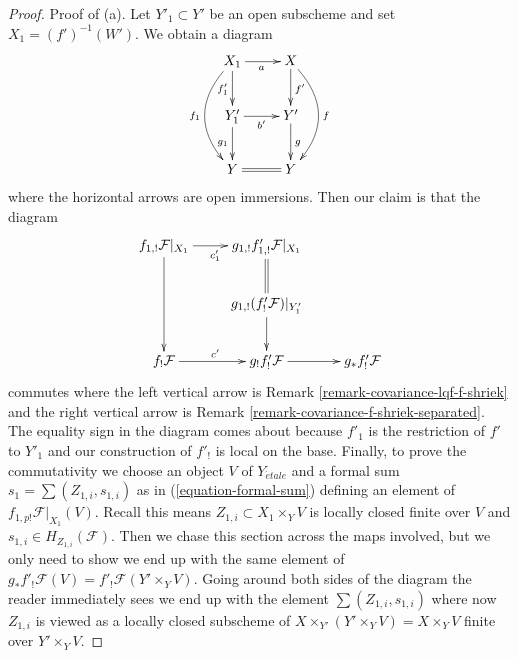 \documentclass{stacks-project}
\theoremstyle{plain}
\theoremstyle{definition}
\theoremstyle{remark}
\numberwithin{equation}{subsection}
\def\etale{{\acute{e}tale}}
\begin{document}
\begin{proof}
\medskip\noindent
Proof of (a). Let $Y'_1 \subset Y'$ be an open subscheme
and set $X_1 = (f')^{-1}(W')$. We obtain a diagram
$$
\xymatrix{
X_1 \ar[d]_{f'_1} \ar[r]_a \ar@/_2em/[dd]_{f_1} &
X \ar[d]^{f'} \ar@/^2em/[dd]^f \\
Y'_1 \ar[d]_{g_1} \ar[r]_{b'} &
Y' \ar[d]^g \\
Y \ar@{=}[r] &
Y
}
$$
where the horizontal arrows are open immersions. Then our claim is that
the diagram
$$
\xymatrix{
f_{1, !}\mathcal{F}|_{X_1} \ar[r]_{c'_1} \ar[dd] &
g_{1, !}f'_{1, !}\mathcal{F}|_{X_1} \ar@{=}[d] \\
& g_{1, !}(f'_!\mathcal{F})|_{Y'_1} \ar[d] \\
f_!\mathcal{F} \ar[r]^{c'} &
g_!f'_!\mathcal{F} \ar[r] & g_*f'_!\mathcal{F}
}
$$
commutes where the left vertical arrow is
Remark \ref{remark-covariance-lqf-f-shriek} and
the right vertical arrow is Remark \ref{remark-covariance-f-shriek-separated}.
The equality sign in the diagram comes about because $f'_1$
is the restriction of $f'$ to $Y'_1$ and our construction
of $f'_!$ is local on the base.
Finally, to prove the commutativity we choose an object $V$ of
$Y_\etale$ and a formal sum $s_1 = \sum (Z_{1, i}, s_{1, i})$ as in
(\ref{equation-formal-sum}) defining an element of
$f_{1, p!}\mathcal{F}|_{X_1}(V)$. Recall this means
$Z_{1, i} \subset X_1 \times_Y V$ is locally closed finite over $V$
and $s_{1, i} \in H_{Z_{1, i}}(\mathcal{F})$.
Then we chase this section
across the maps involved, but we only need to show we
end up with the same element of
$g_*f'_!\mathcal{F}(V) = f'_!\mathcal{F}(Y' \times_Y V)$.
Going around both sides of the diagram the reader immediately
sees we end up with the element $\sum (Z_{1, i}, s_{1, i})$
where now $Z_{1, i}$ is viewed as a locally closed subscheme
of $X \times_{Y'} (Y' \times_Y V) = X \times_Y V$ finite over
$Y' \times_Y V$.


\end{proof}
\end{document}
